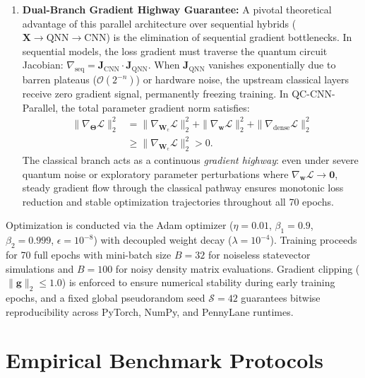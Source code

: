 \documentclass[pdflatex,sn-mathphys-num]{sn-jnl}%
\theoremstyle{thmstyleone}%
\theoremstyle{thmstyletwo}%
\theoremstyle{thmstylethree}%
\begin{document}
\begin{enumerate}
    \item \textbf{Dual-Branch Gradient Highway Guarantee:} A pivotal theoretical advantage of this parallel architecture over sequential hybrids ($\mathbf{X} \to \text{QNN} \to \text{CNN}$) is the elimination of sequential gradient bottlenecks. In sequential models, the loss gradient must traverse the quantum circuit Jacobian: $\nabla_{\mathrm{seq}} = \mathbf{J}_{\mathrm{CNN}} \cdot \mathbf{J}_{\mathrm{QNN}}$. When $\mathbf{J}_{\mathrm{QNN}}$ vanishes exponentially due to barren plateaus ($\mathcal{O}(2^{-n})$) or hardware noise, the upstream classical layers receive zero gradient signal, permanently freezing training. In QC-CNN-Parallel, the total parameter gradient norm satisfies:
    \begin{align}
    \|\nabla_{\boldsymbol{\Theta}} \mathcal{L}\|_2^2 &= \|\nabla_{\mathbf{W}_{\mathrm{c}}} \mathcal{L}\|_2^2 + \|\nabla_{\mathbf{w}} \mathcal{L}\|_2^2 + \|\nabla_{\mathrm{dense}} \mathcal{L}\|_2^2 \nonumber \\
    &\ge \|\nabla_{\mathbf{W}_{\mathrm{c}}} \mathcal{L}\|_2^2 > 0.
    \label{eq:gradient_highway_inequality}
    \end{align}
    The classical branch acts as a continuous \textit{gradient highway}: even under severe quantum noise or exploratory parameter perturbations where $\nabla_{\mathbf{w}} \mathcal{L} \to \mathbf{0}$, steady gradient flow through the classical pathway ensures monotonic loss reduction and stable optimization trajectories throughout all 70 epochs.
\end{enumerate}
Optimization is conducted via the Adam optimizer ($\eta = 0.01$, $\beta_1 = 0.9$, $\beta_2 = 0.999$, $\epsilon = 10^{-8}$) with decoupled weight decay ($\lambda = 10^{-4}$). Training proceeds for 70 full epochs with mini-batch size $B = 32$ for noiseless statevector simulations and $B = 100$ for noisy density matrix evaluations. Gradient clipping ($\|\mathbf{g}\|_2 \le 1.0$) is enforced to ensure numerical stability during early training epochs, and a fixed global pseudorandom seed $\mathcal{S}=42$ guarantees bitwise reproducibility across PyTorch, NumPy, and PennyLane runtimes.

\section{Empirical Benchmark Protocols}
\label{sec:protocols}
\end{document}

